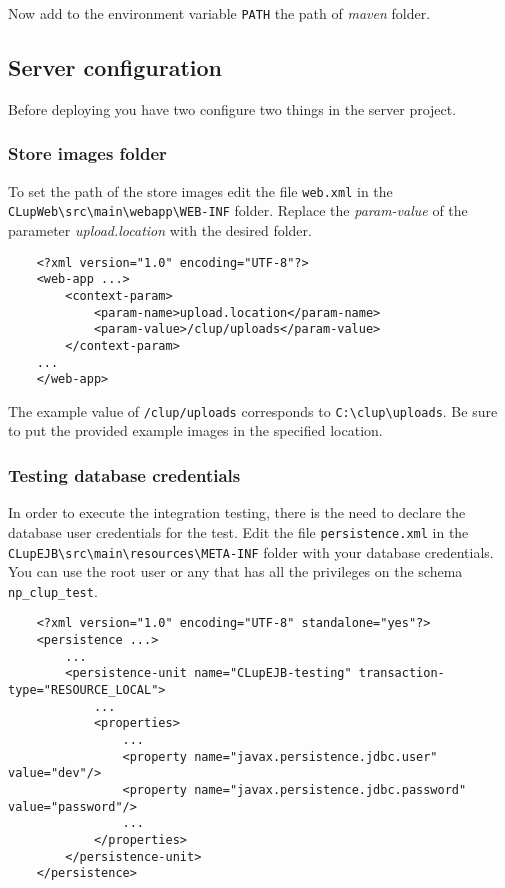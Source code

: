 Now add to the environment variable \verb|PATH| the path of \textit{maven} folder.

\clearpage

\subsection{Server configuration}
Before deploying you have two configure two things in the server project.

\subsubsection{Store images folder}
To set the path of the store images edit the file \verb|web.xml| in the \verb|CLupWeb\src\main\webapp\WEB-INF| folder.
Replace the \textit{param-value} of the parameter \textit{upload.location} with the desired folder.
\begin{lstlisting}
	<?xml version="1.0" encoding="UTF-8"?>
	<web-app ...>
		<context-param>
			<param-name>upload.location</param-name>
			<param-value>/clup/uploads</param-value>
		</context-param>
	...
	</web-app>
\end{lstlisting}

The example value of \verb|/clup/uploads| corresponds to \verb|C:\clup\uploads|. Be sure to put the provided example images in the specified location.

\subsubsection{Testing database credentials} 
In order to execute the integration testing, there is the need to declare the database user credentials for the test.\newline 
Edit the file \verb|persistence.xml| in the \verb|CLupEJB\src\main\resources\META-INF| folder with your database credentials.\newline
You can use the root user or any that has all the privileges on the schema \verb|np_clup_test|.

\begin{lstlisting}
	<?xml version="1.0" encoding="UTF-8" standalone="yes"?>
	<persistence ...>
		...
		<persistence-unit name="CLupEJB-testing" transaction-type="RESOURCE_LOCAL">
			...
			<properties>
				...
				<property name="javax.persistence.jdbc.user" value="dev"/>
				<property name="javax.persistence.jdbc.password" value="password"/>
				...
			</properties>
		</persistence-unit>
	</persistence>
\end{lstlisting}


